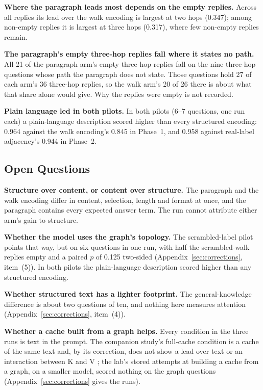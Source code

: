 \documentclass[11pt,a4paper]{article}
\begin{document}
\textbf{Where the paragraph leads most depends on the empty replies.} Across all replies its lead over the walk encoding is largest at two hops (0.347); among non-empty replies it is largest at three hops (0.317), where few non-empty replies remain.

\textbf{The paragraph's empty three-hop replies fall where it states no path.} All 21 of the paragraph arm's empty three-hop replies fall on the nine three-hop questions whose path the paragraph does not state. Those questions hold 27 of each arm's 36 three-hop replies, so the walk arm's 20 of 26 there is about what that share alone would give. Why the replies were empty is not recorded.

\textbf{Plain language led in both pilots.} In both pilots (6--7 questions, one run each) a plain-language description scored higher than every structured encoding: 0.964 against the walk encoding's 0.845 in Phase~1, and 0.958 against real-label adjacency's 0.944 in Phase~2.

\subsection{Open Questions}

\textbf{Structure over content, or content over structure.} The paragraph and the walk encoding differ in content, selection, length and format at once, and the paragraph contains every expected answer term. The run cannot attribute either arm's gain to structure.

\textbf{Whether the model uses the graph's topology.} The scrambled-label pilot points that way, but on six questions in one run, with half the scrambled-walk replies empty and a paired $p$ of 0.125 two-sided (Appendix~\ref{sec:corrections}, item~(5)). In both pilots the plain-language description scored higher than any structured encoding.

\textbf{Whether structured text has a lighter footprint.} The general-knowledge difference is about two questions of ten, and nothing here measures attention (Appendix~\ref{sec:corrections}, item~(4)).

\textbf{Whether a cache built from a graph helps.} Every condition in the three runs is text in the prompt. The companion study's full-cache condition is a cache of the same text and, by its correction, does not show a lead over text or an interaction between K and V \citep{nexus2026kv}; the lab's stored attempts at building a cache from a graph, on a smaller model, scored nothing on the graph questions (Appendix~\ref{sec:corrections} gives the runs).
\end{document}
